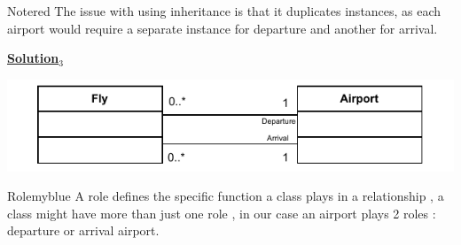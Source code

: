 \newpage
\begin{prettyBox}{Note}{red}
The issue with using inheritance is that it duplicates instances, as each airport would require
a separate instance for departure and another for arrival.  
\end{prettyBox}

\vspace{1cm}
\Large{\textbf{\underline{Solution\(_3\)}}}

\begin{center}
    \includegraphics[height=0.15\textheight]{Exercices/EX1/ex1.3.drawio.pdf}
\end{center}

\vspace{0.5cm}

\begin{prettyBox}{Role}{myblue}
A role defines the specific function a class plays in a relationship , a class might have more
than just one role , in our case an airport plays 2 roles : departure or arrival airport.  
\end{prettyBox}

